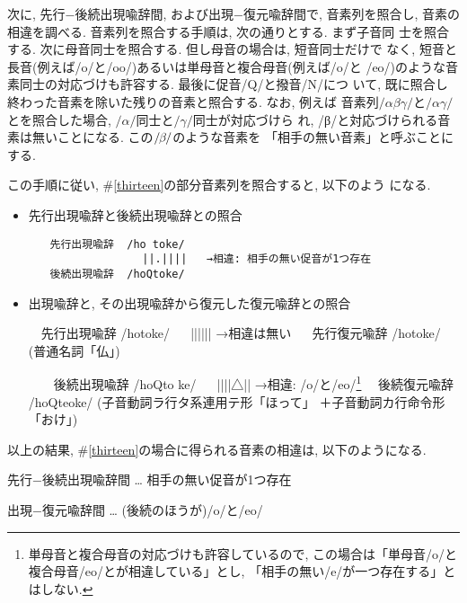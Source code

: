 次に, 先行−後続出現喩辞間, および出現−復元喩辞間で, 音素列を照合し, 
音素の相違を調べる. 音素列を照合する手順は, 次の通りとする. まず子音同
士を照合する. 次に母音同士を照合する. 但し母音の場合は, 短音同士だけで
なく, 短音と長音(例えば/o/と/oo/)あるいは単母音と複合母音(例えば/o/と
/eo/)のような音素同士の対応づけも許容する. 最後に促音/Q/と撥音/N/につ
いて, 既に照合し終わった音素を除いた残りの音素と照合する. なお, 例えば
音素列$/\alpha\beta\gamma/$\hspace*{-0.2mm}と\hspace*{-0.2mm}$/\alpha\gamma/$とを照合した場合, $/\alpha/$同士と\hspace*{-0.3mm}$/\gamma/$同士が対応づけら
れ, /β/と対応づけられる音素は無いことになる. この$/\hspace*{-0.3mm}\beta\hspace*{-0.3mm}/$のような音素を
「相手の無い音素」と呼ぶことにする.  

この手順に従い, \#\ref{thirteen}の部分音素列を照合すると, 以下のよう
になる.  

\vspace*{1em}\begin{itemize}
\item 先行出現喩辞と後続出現喩辞との照合
\begin{verbatim}
　　先行出現喩辞  /ho toke/
    　            ||.||||   →相違: 相手の無い促音が1つ存在
　　後続出現喩辞  /hoQtoke/
\end{verbatim}
\item 出現喩辞と, その出現喩辞から復元した復元喩辞との照合
\begin{example}
  　先行出現喩辞  /hotoke/
    　            ||||||     →相違は無い
 　 先行復元喩辞  /hotoke/
    (普通名詞「仏」)

　　後続出現喩辞   /hoQto ke/
  　               ||||△||   →相違: /o/と/eo/\footnote{単母音と複合母音の対応づけも許容しているので, この場合は「単母音/o/と複合母音/eo/とが相違している」とし, 「相手の無い/e/が一つ存在する」とはしない. } 
  　後続復元喩辞　 /hoQteoke/
      (子音動詞ラ行タ系連用テ形「ほって」
        ＋子音動詞カ行命令形「おけ」)
\end{example}
\end{itemize}\vspace*{1em}
以上の結果, \#\ref{thirteen}の場合に得られる音素の相違は, 以下のようになる. 

\vspace*{1em}\begin{list}{}{}
\item 先行−後続出現喩辞間 … 相手の無い促音が1つ存在
\item 出現−復元喩辞間     … (後続のほうが)/o/と/eo/
\end{list}

